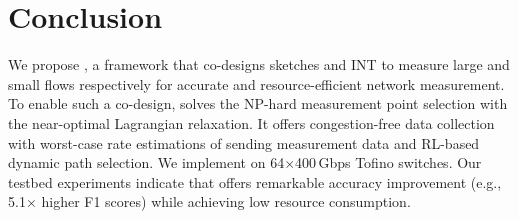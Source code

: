 \section{Conclusion}

We propose \sysname, a framework that co-designs sketches and INT to measure large and small flows respectively for accurate and resource-efficient network measurement. To enable such a co-design, 
\sysname solves the NP-hard measurement point selection with the near-optimal Lagrangian relaxation. It offers congestion-free data collection with worst-case rate estimations of sending measurement data and RL-based dynamic path selection. We implement
\sysname on 64$\times$400\,Gbps Tofino switches. Our testbed experiments indicate that \sysname offers remarkable accuracy improvement (e.g., 5.1$\times$ higher F1 scores) while achieving low resource consumption.


